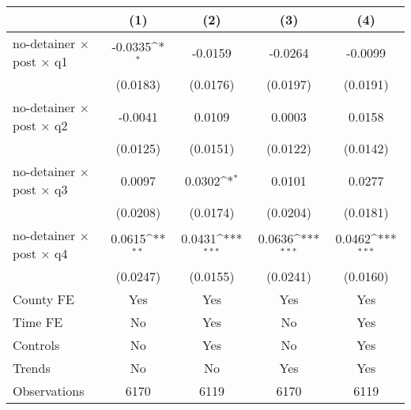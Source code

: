 {
\def\sym#1{\ifmmode^{#1}\else\(^{#1}\)\fi}
\begin{tabular*}{0.7\textwidth}{@{\hskip\tabcolsep\extracolsep\fill}l*{4}{c}}
\hline\hline
                    &\multicolumn{1}{c}{(1)}         &\multicolumn{1}{c}{(2)}         &\multicolumn{1}{c}{(3)}         &\multicolumn{1}{c}{(4)}         \\
\hline
no-detainer $\times$ post $\times$ q1&     -0.0335\sym{*}  &     -0.0159         &     -0.0264         &     -0.0099         \\
                    &    (0.0183)         &    (0.0176)         &    (0.0197)         &    (0.0191)         \\
[1em]
no-detainer $\times$ post $\times$ q2&     -0.0041         &      0.0109         &      0.0003         &      0.0158         \\
                    &    (0.0125)         &    (0.0151)         &    (0.0122)         &    (0.0142)         \\
[1em]
no-detainer $\times$ post $\times$ q3&      0.0097         &      0.0302\sym{*}  &      0.0101         &      0.0277         \\
                    &    (0.0208)         &    (0.0174)         &    (0.0204)         &    (0.0181)         \\
[1em]
no-detainer $\times$ post $\times$ q4&      0.0615\sym{**} &      0.0431\sym{***}&      0.0636\sym{***}&      0.0462\sym{***}\\
                    &    (0.0247)         &    (0.0155)         &    (0.0241)         &    (0.0160)         \\
[1em]
County FE           &         Yes         &         Yes         &         Yes         &         Yes         \\
[1em]
Time FE             &          No         &         Yes         &          No         &         Yes         \\
[1em]
Controls            &          No         &         Yes         &          No         &         Yes         \\
[1em]
Trends              &          No         &          No         &         Yes         &         Yes         \\
\hline
Observations        &        6170         &        6119         &        6170         &        6119         \\
\hline\hline
\end{tabular*}
}
